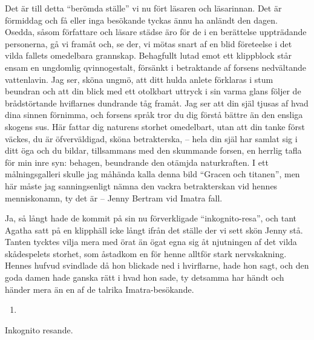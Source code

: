 Det är till detta ``berömda ställe'' vi nu fört läsaren och läsarinnan.
Det är förmiddag och få eller inga besökande tyckas ännu ha anländt den
dagen. Osedda, såsom författare och läsare städse äro för de i en
berättelse uppträdande personerna, gå vi framåt och, se der, vi mötas
snart af en blid företeelse i det vilda fallets omedelbara grannskap.
Behagfullt lutad emot ett klippblock står ensam en ungdomlig
qvinnogestalt, försänkt i betraktande af forsens nedvältande
vattenlavin. Jag ser, sköna ungmö, att ditt hulda anlete förklaras i
stum beundran och att din blick med ett otolkbart uttryck i sin varma
glans följer de brådstörtande hviflarnes dundrande tåg framåt. Jag ser
att din själ tjusas af hvad dina sinnen förnimma, och forsens språk tror
du dig förstå bättre än den ensliga skogens sus. Här fattar dig naturens
storhet omedelbart, utan att din tanke först väckes, du är
öfverväldigad, sköna betrakterska, -- hela din själ har samlat sig i
ditt öga och du bildar, tillsammans med den skummande forsen, en herrlig
tafla för min inre syn: behagen, beundrande den otämjda naturkraften. I
ett målningsgalleri skulle jag måhända kalla denna bild ``Gracen och
titanen'', men här måste jag sanningsenligt nämna den vackra
betrakterskan vid hennes menniskonamn, ty det är -- Jenny Bertram vid
Imatra fall.

Ja, så långt hade de kommit på sin nu förverkligade ``inkognito-resa'',
och tant Agatha satt på en klipphäll icke långt ifrån det ställe der vi
sett skön Jenny stå. Tanten tycktes vilja mera med örat än ögat egna sig
åt njutningen af det vilda skådespelets storhet, som åstadkom en för
henne alltför stark nervskakning. Hennes hufvud svindlade då hon
blickade ned i hvirflarne, hade hon sagt, och den goda damen hade ganska
rätt i hvad hon sade, ty detsamma har händt och händer mera än en af de
talrika Imatra-besökande.

\begin{enumerate}
\def\labelenumi{\arabic{enumi}.}
\setcounter{enumi}{8}
\tightlist
\item
\end{enumerate}

Inkognito resande.

